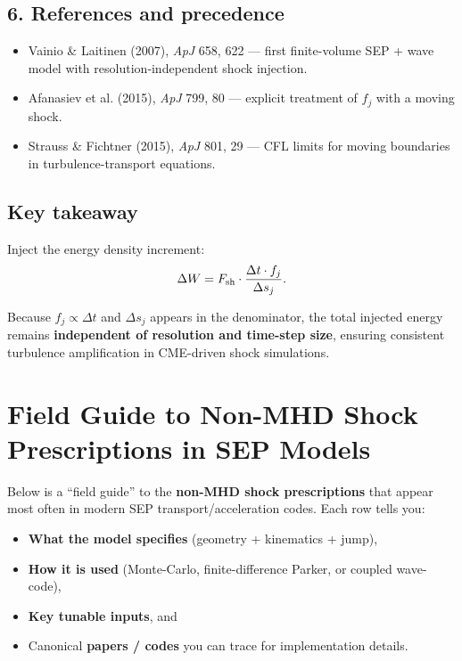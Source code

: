 \subsection*{6. References and precedence}
\begin{itemize}
  \item Vainio \& Laitinen (2007), \emph{ApJ} 658, 622 — first finite-volume SEP + wave model with resolution‐independent shock injection.
  \item Afanasiev et al. (2015), \emph{ApJ} 799, 80 — explicit treatment of $f_j$ with a moving shock.
  \item Strauss \& Fichtner (2015), \emph{ApJ} 801, 29 — CFL limits for moving boundaries in turbulence-transport equations.
\end{itemize}

\subsection*{Key takeaway}

Inject the energy density increment:
\begin{equation}
\Delta W = F_{\rm sh} \cdot \frac{\Delta t \cdot f_j}{\Delta s_j}.
\end{equation}

Because $f_j \propto \Delta t$ and $\Delta s_j$ appears in the denominator, the total injected energy remains \textbf{independent of resolution and time-step size}, ensuring consistent turbulence amplification in CME-driven shock simulations.


\section*{Field Guide to Non-MHD Shock Prescriptions in SEP Models}

Below is a ``field guide'' to the \textbf{non-MHD shock prescriptions} that appear most often in modern SEP transport/acceleration codes. Each row tells you:
\begin{itemize}
    \item \textbf{What the model specifies} (geometry + kinematics + jump),
    \item \textbf{How it is used} (Monte-Carlo, finite-difference Parker, or coupled wave-code),
    \item \textbf{Key tunable inputs}, and
    \item Canonical \textbf{papers / codes} you can trace for implementation details.
\end{itemize}


